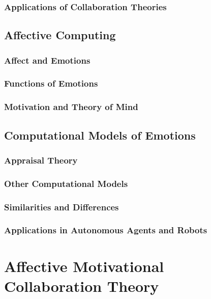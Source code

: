 \documentclass[12pt]{report}
\begin{document}
\subsection{Applications of Collaboration Theories}

\section{Affective Computing}

\subsection{Affect and Emotions}

\subsection{Functions of Emotions}

\subsection{Motivation and Theory of Mind}

\section{Computational Models of Emotions}

\subsection{Appraisal Theory}

\subsection{Other Computational Models}

\subsection{Similarities and Differences}

\subsection{Applications in Autonomous Agents and Robots}

\chapter{Affective Motivational Collaboration Theory}
\label{ch:amct}
\end{document}
